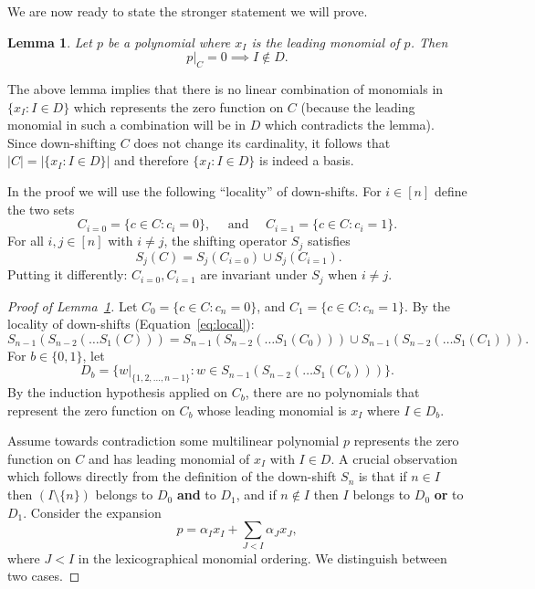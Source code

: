 \documentclass[11pt]{article}
\newtheorem{lemma}[theorem]{Lemma}
\theoremstyle{definition}
\newcommand{\1}{\mathbf{1}}
\newcommand{\setof}[1]{#1}
\begin{document}
\begin{appendix}
We are now ready to state the stronger statement we will prove.
\begin{lemma}\label{lem:leading_monomials}
Let $p$ be a polynomial where $x_I$ is the leading monomial of $p$. Then
 $$p|_C=0 \implies I\notin \setof{D}.$$
\end{lemma}
\noindent
The above lemma implies
that there is no linear combination of monomials in $\{x_I:I\in \setof{D}\}$
which represents the zero function on $C$ (because the leading monomial in such a combination will be in $\setof{D}$ which contradicts the lemma). Since down-shifting $C$ does not change its cardinality, it follows that $|C|=|\{x_I:I\in\setof{D}\}|$ and therefore $\{x_I:I\in \setof{D}\}$ is indeed a basis. 

In the proof we will use the following ``locality'' of down-shifts. 
For $i \in [n]$ define the two sets 
\[ C_{i=0} = \{c\in C : c_i=0\}, \ \ \ \ \ \  \mathrm{ and } \ \ \ \ \ \  C_{i=1} = \{c\in C : c_i=1\}.\]
For all $i,j \in [n]$ with $i\neq j$, the shifting operator $S_j$ satisfies  
\begin{equation}~\label{eq:local}
S_j(C) = S_j(C_{i=0})\cup S_j(C_{i=1}).
\end{equation}
Putting it differently: $C_{i=0},C_{i=1}$ are invariant under $S_j$ when $i\neq j$.
\begin{proof}[Proof of Lemma~\ref{lem:leading_monomials}]
Let $C_0 = \{c\in C : c_n=0\}$, and $C_1 = \{c\in C : c_n=1\}$.
By the locality of down-shifts (Equation~\ref{eq:local}):
$$S_{n-1}(S_{n-2}(\ldots S_1(C))) = S_{n-1}(S_{n-2}(\ldots S_1(C_0)))\cup S_{n-1}(S_{n-2}(\ldots S_1(C_1))).$$
For $b\in\{0,1\}$, let \[D_b=\{w|_{\{1,2,\ldots,n-1\}}:w\in S_{n-1}(S_{n-2}(\ldots S_1(C_b)))\}.\]
By the induction hypothesis applied on $C_b$, there are no polynomials that represent the zero function on $C_b$ whose leading monomial is $x_I$ where $I\in \setof{D_{b}}$.

Assume towards contradiction some multilinear polynomial $p$ represents the zero function on $C$ and has leading monomial of $x_I$ with $I\in D$. %
A crucial observation which follows directly from the definition of the down-shift $S_n$ is that if $n\in I$ then $(I\setminus\{n\})$ belongs to $\setof{D_0}$ {\bf and} to $\setof{D_1}$, and if $n\notin I$ then $I$ belongs to $\setof{D_0}$ {\bf or} to $\setof{D_1}$.
Consider the expansion 
$$p=\alpha_I x_I + \sum_{J < I}{\alpha_J x_J},$$
where $J < I$ in the lexicographical monomial ordering.  We distinguish between two cases.


\end{proof}
\end{appendix}
\end{document}
